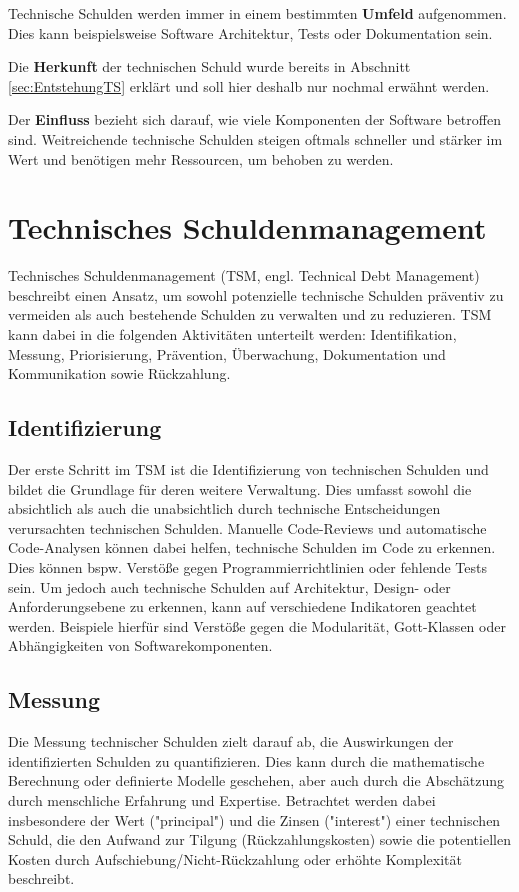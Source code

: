 \documentclass[acmtog]{acmart}
\begin{document}
Technische Schulden werden immer in einem bestimmten \textbf{Umfeld} aufgenommen.
Dies kann beispielsweise Software Architektur, Tests oder Dokumentation sein.

Die \textbf{Herkunft} der technischen Schuld wurde bereits in Abschnitt \ref{sec:EntstehungTS} erklärt
und soll hier deshalb nur nochmal erwähnt werden.

Der \textbf{Einfluss} bezieht sich darauf, wie viele Komponenten der Software
betroffen sind. Weitreichende technische Schulden steigen oftmals schneller
und stärker im Wert und benötigen mehr Ressourcen, um behoben zu werden.


\section{Technisches Schuldenmanagement}\label{sec:TSM}

Technisches Schuldenmanagement (TSM, engl. Technical Debt Management) beschreibt
einen Ansatz, um sowohl potenzielle technische Schulden präventiv zu vermeiden
als auch bestehende Schulden zu verwalten und zu reduzieren. TSM kann dabei in
die folgenden Aktivitäten unterteilt werden: Identifikation, Messung, Priorisierung,
Prävention, Überwachung, Dokumentation und Kommunikation sowie Rückzahlung. \cite{Alves16}

\subsection{Identifizierung}\label{sec:TSM_Identifizierung}
Der erste Schritt im TSM ist die Identifizierung von technischen Schulden
und bildet die Grundlage für deren weitere Verwaltung. Dies umfasst sowohl
die absichtlich als auch die unabsichtlich durch technische Entscheidungen
verursachten technischen Schulden. Manuelle Code-Reviews und automatische
Code-Analysen können dabei helfen, technische Schulden im Code zu erkennen.
Dies können bspw. Verstöße gegen Programmierrichtlinien oder fehlende Tests sein.
Um jedoch auch technische Schulden auf Architektur, Design- oder Anforderungsebene
zu erkennen, kann auf verschiedene Indikatoren geachtet werden. Beispiele hierfür
sind Verstöße gegen die Modularität, Gott-Klassen oder Abhängigkeiten von
Softwarekomponenten. \cite{Alves16}

\subsection{Messung}\label{sec:TSM_Messung}
Die Messung technischer Schulden zielt darauf ab, die Auswirkungen der
identifizierten Schulden zu quantifizieren. Dies kann durch die mathematische
Berechnung oder definierte Modelle geschehen, aber auch durch die Abschätzung
durch menschliche Erfahrung und Expertise. Betrachtet werden dabei insbesondere
der Wert ("principal") und die Zinsen ("interest") einer technischen Schuld,
die den Aufwand zur Tilgung (Rückzahlungskosten) sowie die potentiellen Kosten
durch Aufschiebung/Nicht-Rückzahlung oder erhöhte Komplexität beschreibt. \cite{Alves16}
\end{document}
